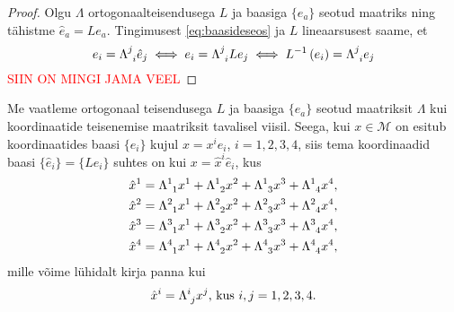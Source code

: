 \documentclass[a4paper,12pt]{article}
\numberwithin{equation}{section}
\begin{document}
\begin{proof}
Olgu $\Lambda$ ortogonaalteisendusega $L$ ja baasiga $\{e_a\}$ seotud maatriks ning tähistme $\hat{e}_a = Le_a$. Tingimusest \ref{eq:baasideseos} ja $L$ lineaarsusest saame, et 
\begin{equation*}
e_i = \Lambda\indices{^j_i} \hat{e}_j \iff e_i = \Lambda\indices{^j_i} Le_j \iff L^{-1} \left(e_i\right) = \Lambda\indices{^j_i} e_j
\end{equation*}
\textcolor{red}{SIIN ON MINGI JAMA VEEL}
\end{proof}

Me vaatleme ortogonaal teisendusega $L$ ja baasiga $\{e_a\}$ seotud maatriksit $\Lambda$ kui koordinaatide teisenemise maatriksit tavalisel viisil. Seega, kui $x \in \mathcal{M}$ on esitub koordinaatides baasi $\{e_i\}$ kujul $x = x^i e_i$, $i = 1, 2, 3, 4$, siis tema koordinaadid baasi $\{\hat{e}_i\} = \{Le_i\}$ suhtes on kui $x = \hat{x}^i \hat{e}_i$, kus
\begin{eqnarray*}
\hat{x}^1 = \Lambda\indices{^1_1} x^1 + \Lambda\indices{^1_2} x^2 + \Lambda\indices{^1_3} x^3 + \Lambda\indices{^1_4} x^4, \\
\hat{x}^2 = \Lambda\indices{^2_1} x^1 + \Lambda\indices{^2_2} x^2 + \Lambda\indices{^2_3} x^3 + \Lambda\indices{^2_4} x^4, \\
\hat{x}^3 = \Lambda\indices{^3_1} x^1 + \Lambda\indices{^3_2} x^2 + \Lambda\indices{^3_3} x^3 + \Lambda\indices{^3_4} x^4, \\
\hat{x}^4 = \Lambda\indices{^4_1} x^1 + \Lambda\indices{^4_2} x^2 + \Lambda\indices{^4_3} x^3 + 
\Lambda\indices{^4_4} x^4,
\end{eqnarray*}
mille võime lühidalt kirja panna kui
\begin{equation}
\hat{x}^i = \Lambda\indices{^i_j} x^j \text{, kus } i,j=1, 2, 3, 4.
\end{equation}
\end{document}
